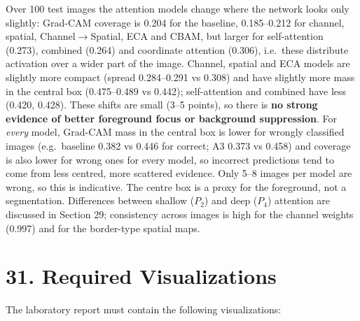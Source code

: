 \documentclass[10pt]{article}
\begin{document}
Over 100 test images the attention models change where the network looks only slightly: Grad-CAM coverage is 0.204 for the baseline, 0.185--0.212 for channel, spatial, Channel$\to$Spatial, ECA and CBAM, but larger for self-attention (0.273), combined (0.264) and coordinate attention (0.306), i.e.\ these distribute activation over a wider part of the image. Channel, spatial and ECA models are slightly more compact (spread 0.284--0.291 vs 0.308) and have slightly more mass in the central box (0.475--0.489 vs 0.442); self-attention and combined have less (0.420, 0.428). These shifts are small (3--5 points), so there is \textbf{no strong evidence of better foreground focus or background suppression}. For \emph{every} model, Grad-CAM mass in the central box is lower for wrongly classified images (e.g.\ baseline 0.382 vs 0.446 for correct; A3 0.373 vs 0.458) and coverage is also lower for wrong ones for every model, so incorrect predictions tend to come from less centred, more scattered evidence. Only 5--8 images per model are wrong, so this is indicative. The centre box is a proxy for the foreground, not a segmentation. Differences between shallow ($P_2$) and deep ($P_4$) attention are discussed in Section 29; consistency across images is high for the channel weights (0.997) and for the border-type spatial maps.


\section*{31. Required Visualizations}

The laboratory report must contain the following visualizations:
\end{document}
